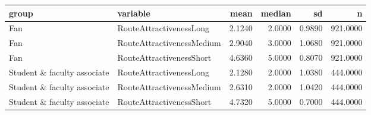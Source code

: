 \begin{tabular}{llrrrr}
  \hline
group & variable & mean & median & sd & n \\ 
  \hline
Fan & RouteAttractivenessLong & 2.1240 & 2.0000 & 0.9890 & 921.0000 \\ 
  Fan & RouteAttractivenessMedium & 2.9040 & 3.0000 & 1.0680 & 921.0000 \\ 
  Fan & RouteAttractivenessShort & 4.6360 & 5.0000 & 0.8070 & 921.0000 \\ 
  Student \& faculty associate & RouteAttractivenessLong & 2.1280 & 2.0000 & 1.0380 & 444.0000 \\ 
  Student \& faculty associate & RouteAttractivenessMedium & 2.6310 & 2.0000 & 1.0420 & 444.0000 \\ 
  Student \& faculty associate & RouteAttractivenessShort & 4.7320 & 5.0000 & 0.7000 & 444.0000 \\ 
   \hline
\end{tabular}
